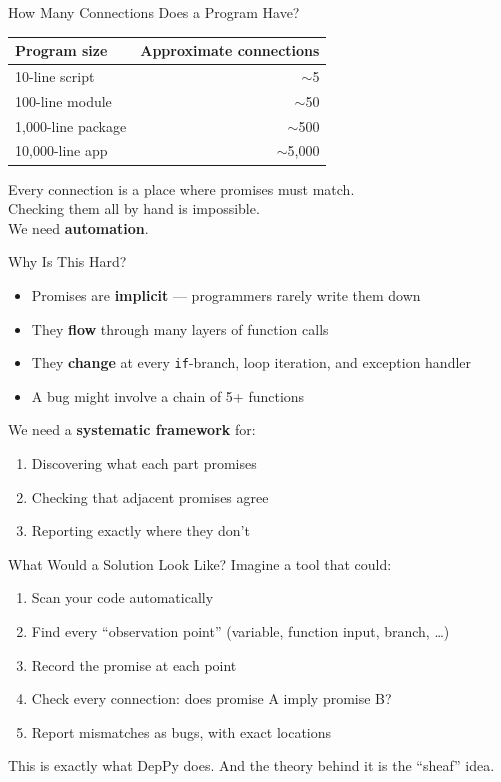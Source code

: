 \documentclass[aspectratio=169,10pt]{beamer}
\newcommand{\hint}[1]{\begin{center}
  \colorbox{hintbg}{\parbox{0.88\textwidth}{\centering\small #1}}\end{center}}
\begin{document}
\begin{frame}{How Many Connections Does a Program Have?}
\begin{center}
\begin{tabular}{@{}lr@{}}
\textbf{Program size} & \textbf{Approximate connections} \\
\hline
10-line script     & $\sim$5 \\
100-line module    & $\sim$50 \\
1,000-line package & $\sim$500 \\
10,000-line app    & $\sim$5,000 \\
\end{tabular}
\end{center}
\vspace{0.3em}
Every connection is a place where promises must match.\\
Checking them all by hand is impossible.\\
We need \textbf{automation}.
\end{frame}

\begin{frame}{Why Is This Hard?}
\begin{itemize}
  \item Promises are \textbf{implicit} --- programmers rarely write them down
  \item They \textbf{flow} through many layers of function calls
  \item They \textbf{change} at every \texttt{if}-branch, loop iteration, and exception handler
  \item A bug might involve a chain of 5+ functions
\end{itemize}
\vspace{0.3em}
We need a \textbf{systematic framework} for:
\begin{enumerate}
  \item Discovering what each part promises
  \item Checking that adjacent promises agree
  \item Reporting exactly where they don't
\end{enumerate}
\end{frame}

\begin{frame}{What Would a Solution Look Like?}
Imagine a tool that could:
\vspace{0.3em}
\begin{enumerate}
  \item Scan your code automatically
  \item Find every ``observation point'' (variable, function input, branch, \ldots)
  \item Record the promise at each point
  \item Check every connection: does promise A imply promise B?
  \item Report mismatches as bugs, with exact locations
\end{enumerate}
\vspace{0.5em}
\hint{This is exactly what DepPy does. And the theory behind it is the ``sheaf'' idea.}
\end{frame}
\end{document}
